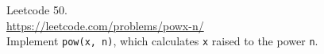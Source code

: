   Leetcode 50.\\
  \url{https://leetcode.com/problems/powx-n/}\\
  Implement \verb!pow(x, n)!,
  which calculates \verb!x! raised to the power
  \verb!n!.
